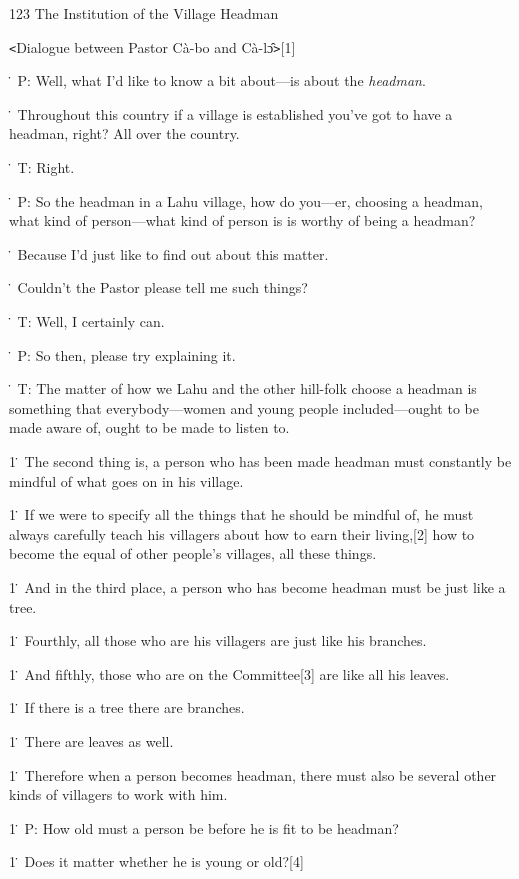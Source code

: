 
{123 The Institution of the Village Headman}

{\texttt{<}Dialogue between Pastor Cà-bo and Cà-lɔ̂\texttt{>}[1]}

{\. P: Well, what I'd like to know a bit about---is about the }{\textit{headman}}{.}

{\. Throughout this country if a village is established you've got to have
a headman, right? All over the country.}

{\. T: Right.}

{\. P: So the headman in a Lahu village, how do you---er, choosing a headman,
what kind of person---what kind of person is is worthy of being a headman?}

{\. Because I'd just like to find out about this matter.}

{\. Couldn't the Pastor please tell me such things?}

{\. T: Well, I certainly can.}

{\. P: So then, please try explaining it.}

{\. T: The matter of how we Lahu and the other hill-folk choose a headman
is something that everybody---women and young people included---ought to be made
aware of, ought to be made to listen to.}

{1\. The second thing is, a person who has been made headman must constantly
be mindful of what goes on in his village.}

{1\. If we were to specify all the things that he should be mindful of,
he must always carefully teach his villagers about how to earn their living,[2]
how to become the equal of other people's villages, all these things.}

{1\. And in the third place, a person who has become headman must be just
like a tree.}

{1\. Fourthly, all those who are his villagers are just like his branches.}

{1\. And fifthly, those who are on the Committee[3] are like all his leaves.}

{1\. If there is a tree there are branches.}

{1\. There are leaves as well.}

{1\. Therefore when a person becomes headman, there must also be several
other kinds of villagers to work with him.}

{1\. P: How old must a person be before he is fit to be headman?}

{1\. Does it matter whether he is young or old?[4]}

